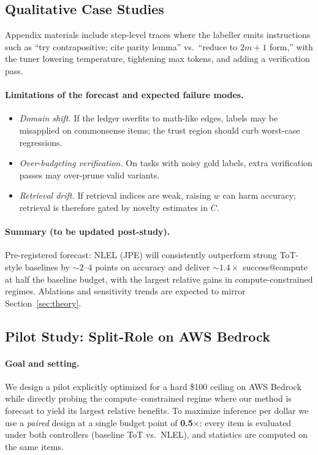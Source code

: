 \documentclass{article}
\theoremstyle{plain}
\theoremstyle{definition}
\theoremstyle{remark}
\begin{document}
\subsection{Qualitative Case Studies}

Appendix materials include step-level traces where the labeller emits instructions such as ``try contrapositive; cite parity lemma'' vs.\ ``reduce to $2m{+}1$ form,'' with the tuner lowering temperature, tightening max tokens, and adding a verification pass.

\paragraph{Limitations of the forecast and expected failure modes.}
\begin{itemize}\setlength{\itemsep}{2pt}
    \item \emph{Domain shift.} If the ledger overfits to math-like edges, labels may be misapplied on commonsense items; the trust region should curb worst-case regressions.
    \item \emph{Over-budgeting verification.} On tasks with noisy gold labels, extra verification passes may over-prune valid variants.
    \item \emph{Retrieval drift.} If retrieval indices are weak, raising $w$ can harm accuracy; retrieval is therefore gated by novelty estimates in $C$.
\end{itemize}

\paragraph{Summary (to be updated post-study).}
Pre-registered forecast: NLEL (JPE) will consistently outperform strong ToT-style baselines by $\sim2$--$4$ points on accuracy and deliver $\sim1.4\times$ success@compute at half the baseline budget, with the largest relative gains in compute-constrained regimes. Ablations and sensitivity trends are expected to mirror Section~\ref{sec:theory}.




\subsection{Pilot Study: Split-Role on AWS Bedrock}\label{sec:pilot-splitrole}

\paragraph{Goal and setting.}
We design a pilot explicitly optimized for a hard \$100 ceiling on AWS Bedrock while directly probing the compute–constrained regime where our method is forecast to yield its largest relative benefits.
To maximize inference per dollar we use a \emph{paired} design at a single budget point of \textbf{0.5$\times$}: every item is evaluated under both controllers (baseline ToT vs.\ NLEL), and statistics are computed on the same items.
\end{document}
